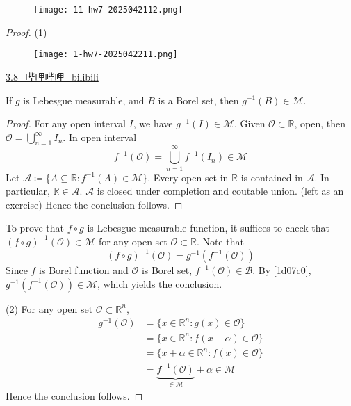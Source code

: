 \begin{exercise}
\begin{figure}[H]
\centering
\texttt{[image: 11-hw7-2025042112.png]}
\label{}
\end{figure}
\end{exercise}
\begin{proof}
(1)

\begin{remark}
\begin{figure}[H]
\centering
\texttt{[image: 1-hw7-2025042211.png]}
\label{}
\end{figure}
\end{remark}
\href{https://www.bilibili.com/video/BV1Wq4y1P7d3?spm_id_from=333.788.videopod.episodes&vd_source=b55594d2ba73cdd7666e94ca2cf2fe93&p=8}{3.8\_哔哩哔哩\_bilibili}

\begin{lemma}
If $g$ is Lebesgue measurable, and $B$ is a Borel set, then $g^{-1}(B)\in \mathcal{M}$.\label{1d07c0}
\end{lemma}

\begin{proof}
For any open interval $I$, we have $g^{-1}(I)\in \mathcal{M}$. Given $\mathcal{O}\subset \mathbb{R}$, open, then $\mathcal{O}=\bigcup_{n=1}^{\infty}I_n$. In open interval
\[
f^{-1}(\mathcal{O})=\bigcup_{n=1}^{\infty} f^{-1}(I_n)\in \mathcal{M}
\]
Let $\mathcal{A}\coloneqq \{ A\subseteq \mathbb{R}:f^{-1}(A)\in \mathcal{M} \}$. Every open set in $\mathbb{R}$ is contained in $\mathcal{A}$. In particular, $\mathbb{R}\in \mathcal{A}$. $\mathcal{A}$ is closed under completion and coutable union. (left as an exercise) Hence the conclusion follows.
\end{proof}
To prove that $f\circ g$ is Lebesgue measurable function, it suffices to check that $(f\circ g)^{-1}(\mathcal{O})\in \mathcal{M}$ for any open set $\mathcal{O}\subset \mathbb{R}$. Note that
\[
(f\circ g)^{-1}(\mathcal{O})=g^{-1}(f^{-1}(\mathcal{O}))
\]
Since $f$ is Borel function and $\mathcal{O}$ is Borel set, $f^{-1}(\mathcal{O})\in \mathcal{B}$. By \cref{1d07c0}, $g^{-1}(f^{-1}(\mathcal{O}))\in \mathcal{M}$, which yields the conclusion.

(2) For any open set $\mathcal{O}\subset \mathbb{R}^{n}$,
\[
\begin{aligned}
g^{-1}(\mathcal{O}) & =\{ x\in \mathbb{R}^{n}:g(x)\in \mathcal{O} \} \\
 & =\{ x\in \mathbb{R}^{n}:f(x-\alpha)\in \mathcal{O} \} \\
 & =\{ x+\alpha\in \mathbb{R}^{n}:f(x)\in \mathcal{O} \} \\
 & =\underbrace{ f^{-1}(\mathcal{O}) }_{ \in \mathcal{M} }+\alpha \in \mathcal{M}
\end{aligned}
\]
Hence the conclusion follows.
\end{proof}

